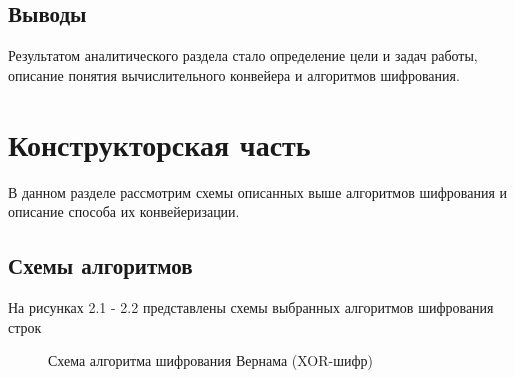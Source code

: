 \documentclass[12pt,a4paper]{report}
\begin{document}
\section{Выводы}

Результатом аналитического раздела стало определение цели и задач работы, описание понятия 
вычислительного конвейера и алгоритмов шифрования. 

\newpage
\chapter{Конструкторская часть}

В данном разделе рассмотрим схемы описанных выше алгоритмов шифрования и описание способа 
их конвейеризации.

\section{Схемы алгоритмов}

На рисунках 2.1 - 2.2 представлены схемы выбранных алгоритмов шифрования строк

\begin{figure}[h!]
    \caption{Схема алгоритма шифрования Вернама (XOR-шифр)}
    \label{fig:image}
\end{figure}
\end{document}
